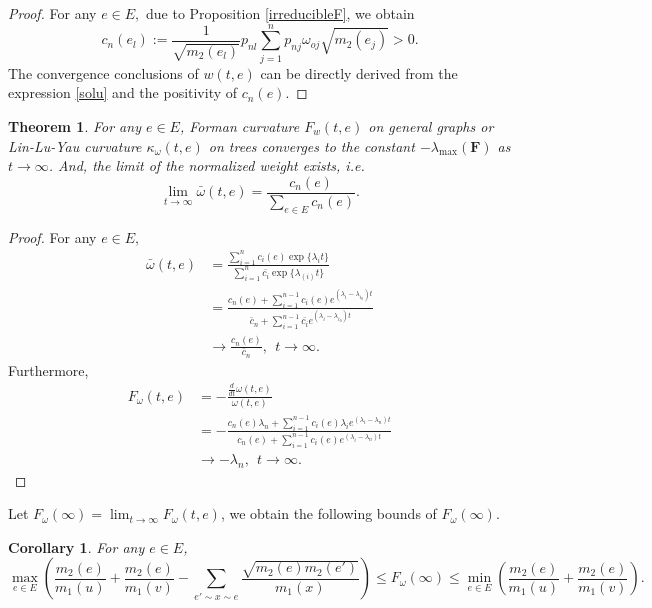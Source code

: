 \documentclass{article}
\newtheorem{theorem}{Theorem}[section]
\newtheorem{corollary}{Corollary}[section]
\begin{document}
\begin{proof}
For any $e\in E,$ due to Proposition \ref{irreducibleF}, we obtain  
\[c_{n}(e_l):=\frac{1}{\sqrt{m_2(e_{l})}}p_{nl}\sum_{j=1}^{n}p_{nj}\omega_{oj}\sqrt{m_2(e_j)}>0.\]
The convergence conclusions of $w(t,e)$ can be directly derived from the expression \eqref{solu} and the positivity of $c_{n}(e)$.
\end{proof}
\begin{theorem} \label{th:main}
For any $e\in E$, Forman curvature $F_w(t,e)$ on general graphs or Lin-Lu-Yau curvature $\kappa_{\omega}(t,e)$  on trees converges to  the constant $-\lambda_{\max}({\textbf{\~{F}}})$ as $t\rightarrow \infty$. And, the limit of the normalized weight exists, i.e.
    \[\lim_{t \to \infty}\bar{\omega}(t,e)=\frac{c_{n}(e)}{\sum_{e\in E}c_{n}(e)}.\]
\end{theorem}
\begin{proof}
For any $e\in E,$
\[\begin{split}
    \bar{\omega}(t,e)&= \frac{\sum_{i=1}^nc_i(e) \exp\{\lambda_{i} t\}}{\sum_{i=1}^{n}\bar{c_i}\exp\{\lambda_{(i)} t\}}\\
    &=\frac{c_{n}(e)+\sum_{i=1}^{n-1}c_i(e)e^{(\lambda_i-\lambda_{i_0})t}}{\bar{c}_{n}+\sum_{i=1}^{n-1}\bar{c_i}e^{(\lambda_i-\lambda_{i_0})t}}\\
    &\rightarrow\frac{c_{n}(e)}{\bar{c}_{n}},~~t\rightarrow \infty.
\end{split}\]
Furthermore, 
\[
\begin{split}
    F_\omega(t,e) &=-\frac{\frac{d}{dt}\omega(t,e)}{\omega(t,e)}\\
   & =-\frac{c_{n}(e)\lambda_{n}+\sum_{i=1}^{n-1}c_i(e)\lambda_ie^{(\lambda_i-\lambda_{n})t}}{c_{n}(e)+\sum_{i=1}^{n-1}c_i(e)e^{(\lambda_i-\lambda_{n})t}}\\
   &\rightarrow-\lambda_{n},~~t\rightarrow \infty.
\end{split}
\]
\end{proof}
Let $F_\omega(\infty)=\lim_{t\rightarrow\infty}F_\omega(t,e)$, we obtain the following bounds of $F_\omega(\infty)$.
\begin{corollary}For any $e\in E$, 
     \[\max_{e\in E}\left(\frac{m_2(e)}{m_1(u)}+\frac{m_2(e)}{m_1(v)}-\sum_{e'\sim x\sim e}\frac{\sqrt{m_2(e)m_2(e')}}{m_1(x)}\right)\leq 
     F_\omega(\infty)
     \leq\min_{e\in E}\left(\frac{m_2(e)}{m_1(u)}+\frac{m_2(e)}{m_1(v)}\right).\] 
\end{corollary}
\end{document}
